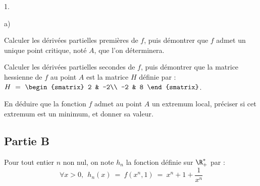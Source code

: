 \documentclass[11pt]{article}%
\begin{document}
\begin{noliste}{1.}
\begin{noliste}{a)}
  \item Calculer les dérivées partielles premières de $f$, puis
    démontrer que $f$ admet un unique point critique, noté $A$, que
    l'on déterminera.
    
  \item Calculer les dérivées partielles secondes de $f$, puis
    démontrer que la matrice hessienne de $f$ au point $A$ est la
    matrice $H$ définie par : $H \ = \
    \begin{smatrix}
      2 & -2\\
      -2 & 8
    \end{smatrix}$.
  \item En déduire que la fonction $f$ admet au point $A$ un extremum
    local, préciser si cet extremum est un minimum, et donner sa
    valeur.
  \end{noliste}
\end{noliste}

\subsection*{Partie B} 

\noindent
Pour tout entier $n$ non nul, on note $h_n$ la fonction définie sur
$\R_+^{*}$ par :
\[
\forall x >0, \ \ h_n(x) \ = \ f(x^n,1) \ = \ x^n + 1 + \dfrac{1}{x^n}
\]
\end{document}

